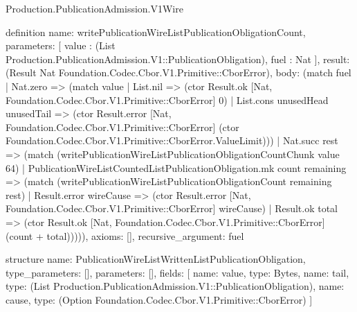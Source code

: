 \begin{lexlean}{Production.PublicationAdmission.V1Wire}
\begin{semanticmodule}
definition{
  name: writePublicationWireListPublicationObligationCount,
  parameters: [
    value : (List Production.PublicationAdmission.V1::PublicationObligation),
    fuel : Nat
  ],
  result: (Result Nat Foundation.Codec.Cbor.V1.Primitive::CborError),
  body: (match fuel
    | Nat.zero => (match value
      | List.nil => (ctor Result.ok [Nat, Foundation.Codec.Cbor.V1.Primitive::CborError] 0)
      | List.cons unusedHead unusedTail => (ctor Result.error [Nat, Foundation.Codec.Cbor.V1.Primitive::CborError] (ctor Foundation.Codec.Cbor.V1.Primitive::CborError.ValueLimit)))
    | Nat.succ rest => (match (writePublicationWireListPublicationObligationCountChunk value 64)
      | PublicationWireListCountedListPublicationObligation.mk count remaining => (match (writePublicationWireListPublicationObligationCount remaining rest)
        | Result.error wireCause => (ctor Result.error [Nat, Foundation.Codec.Cbor.V1.Primitive::CborError] wireCause)
        | Result.ok total => (ctor Result.ok [Nat, Foundation.Codec.Cbor.V1.Primitive::CborError] (count + total))))),
  axioms: [],
  recursive_argument: fuel
}

structure{
  name: PublicationWireListWrittenListPublicationObligation,
  type_parameters: [],
  parameters: [],
  fields: [
    {name: value, type: Bytes},
    {name: tail, type: (List Production.PublicationAdmission.V1::PublicationObligation)},
    {name: cause, type: (Option Foundation.Codec.Cbor.V1.Primitive::CborError)}
  ]
}


\end{semanticmodule}
\end{lexlean}
